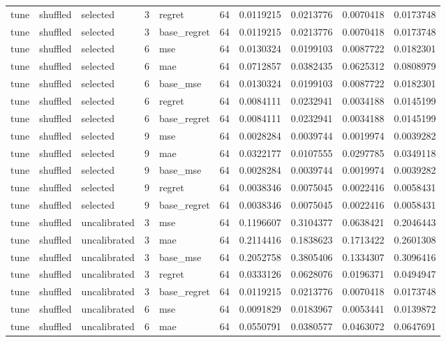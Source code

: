 \begin{tabular}{lllrlrrrrr}
tune & shuffled & selected & 3 & regret & 64 & 0.0119215 & 0.0213776 & 0.0070418 & 0.0173748 \\
tune & shuffled & selected & 3 & base_regret & 64 & 0.0119215 & 0.0213776 & 0.0070418 & 0.0173748 \\
tune & shuffled & selected & 6 & mse & 64 & 0.0130324 & 0.0199103 & 0.0087722 & 0.0182301 \\
tune & shuffled & selected & 6 & mae & 64 & 0.0712857 & 0.0382435 & 0.0625312 & 0.0808979 \\
tune & shuffled & selected & 6 & base_mse & 64 & 0.0130324 & 0.0199103 & 0.0087722 & 0.0182301 \\
tune & shuffled & selected & 6 & regret & 64 & 0.0084111 & 0.0232941 & 0.0034188 & 0.0145199 \\
tune & shuffled & selected & 6 & base_regret & 64 & 0.0084111 & 0.0232941 & 0.0034188 & 0.0145199 \\
tune & shuffled & selected & 9 & mse & 64 & 0.0028284 & 0.0039744 & 0.0019974 & 0.0039282 \\
tune & shuffled & selected & 9 & mae & 64 & 0.0322177 & 0.0107555 & 0.0297785 & 0.0349118 \\
tune & shuffled & selected & 9 & base_mse & 64 & 0.0028284 & 0.0039744 & 0.0019974 & 0.0039282 \\
tune & shuffled & selected & 9 & regret & 64 & 0.0038346 & 0.0075045 & 0.0022416 & 0.0058431 \\
tune & shuffled & selected & 9 & base_regret & 64 & 0.0038346 & 0.0075045 & 0.0022416 & 0.0058431 \\
tune & shuffled & uncalibrated & 3 & mse & 64 & 0.1196607 & 0.3104377 & 0.0638421 & 0.2046443 \\
tune & shuffled & uncalibrated & 3 & mae & 64 & 0.2114416 & 0.1838623 & 0.1713422 & 0.2601308 \\
tune & shuffled & uncalibrated & 3 & base_mse & 64 & 0.2052758 & 0.3805406 & 0.1334307 & 0.3096416 \\
tune & shuffled & uncalibrated & 3 & regret & 64 & 0.0333126 & 0.0628076 & 0.0196371 & 0.0494947 \\
tune & shuffled & uncalibrated & 3 & base_regret & 64 & 0.0119215 & 0.0213776 & 0.0070418 & 0.0173748 \\
tune & shuffled & uncalibrated & 6 & mse & 64 & 0.0091829 & 0.0183967 & 0.0053441 & 0.0139872 \\
tune & shuffled & uncalibrated & 6 & mae & 64 & 0.0550791 & 0.0380577 & 0.0463072 & 0.0647691 \\

\end{tabular}
